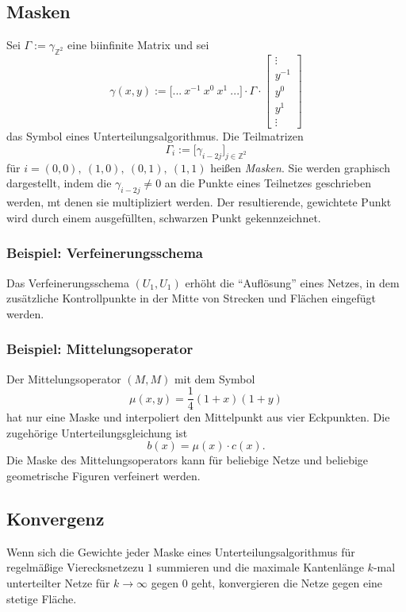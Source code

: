 \subsection{Masken}
Sei \(\Gamma := \gamma_{\mathbb{Z}^2}\) eine biinfinite Matrix und sei
\[\gamma(x,y) := \lbrack ...~x^{-1}~x^0~x^1~...\rbrack \cdot \Gamma \cdot \begin{bmatrix} \vdots \\ y^{-1} \\ y^0 \\ y^1 \\ \vdots \end{bmatrix}\]
das Symbol eines Unterteilungsalgorithmus. Die Teilmatrizen
\[\Gamma_i := \lbrack \gamma_{i-2j} \rbrack_{j \in \mathbb{Z}^2}\]
für \(i=(0,0),~(1,0),~(0,1),~(1,1)\) heißen \textit{Masken}. Sie werden graphisch dargestellt, indem die \(\gamma_{i-2j} \ne 0\) an die Punkte eines Teilnetzes geschrieben werden, mt denen sie multipliziert werden. Der resultierende, gewichtete Punkt wird durch einem ausgefüllten, schwarzen Punkt gekennzeichnet.

\subsubsection{Beispiel: Verfeinerungsschema}
Das Verfeinerungsschema \((U_1,U_1)\) erhöht die "`Auflösung"' eines Netzes, in dem zusätzliche Kontrollpunkte in der Mitte von Strecken und Flächen eingefügt werden.

\subsubsection{Beispiel: Mittelungsoperator}
Der Mittelungsoperator \((M,M)\) mit dem Symbol
\[\mu(x,y)= \frac{1}{4}(1+x)(1+y)\]
hat nur eine Maske und interpoliert den Mittelpunkt aus vier Eckpunkten. Die zugehörige Unterteilungsgleichung ist
\[b(x) = \mu(x) \cdot c(x).\]
Die Maske des Mittelungsoperators kann für beliebige Netze und beliebige geometrische Figuren verfeinert werden.


\subsection{Konvergenz}
Wenn sich die Gewichte jeder Maske eines Unterteilungsalgorithmus für regelmäßige Vierecksnetzezu \(1\) summieren und die maximale Kantenlänge \(k\)-mal unterteilter Netze für \(k \rightarrow \infty\) gegen \(0\) geht, konvergieren die Netze gegen eine stetige Fläche.


